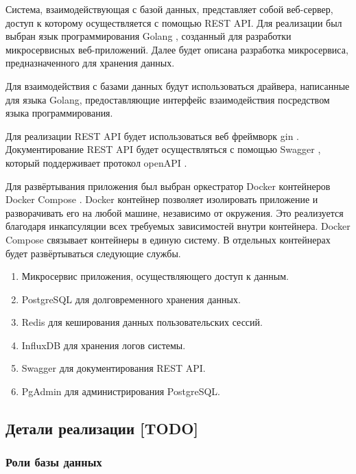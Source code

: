 Система, взаимодействующая с базой данных, представляет собой веб-сервер, доступ к которому осуществляется с помощью REST API. Для реализации был выбран язык программирования Golang \cite{Golang}, созданный для разработки микросервисных веб-приложений. Далее будет описана разработка микросервиса, предназначенного для хранения данных. 

Для взаимодействия с базами данных будут использоваться драйвера, написанные для языка Golang, предоставляющие интерфейс взаимодействия посредством языка программирования.

Для реализации REST API будет использоваться веб фреймворк gin \cite{Gin}. Документирование REST API будет осуществляться с помощью Swagger \cite{Swagger}, который поддерживает протокол openAPI \cite{openAPI}.

Для развёртывания приложения был выбран оркестратор Docker контейнеров Docker Compose \cite{Docker_compose}. Docker контейнер позволяет изолировать приложение и разворачивать его на любой машине, независимо от окружения. Это реализуется благодаря инкапсуляции всех требуемых зависимостей внутри контейнера. Docker Compose связывает контейнеры в единую систему. В отдельных контейнерах будет развёртываться следующие службы.

\begin{enumerate}[label*=\arabic*.]
	\item Микросервис приложения, осуществляющего доступ к данным.
	\item PostgreSQL для долговременного хранения данных.
	\item Redis для кеширования данных пользовательских сессий.
	\item InfluxDB для хранения логов системы.
	\item Swagger для документирования REST API.
	\item PgAdmin для администрирования PostgreSQL.
\end{enumerate}




\subsection{Детали реализации [TODO]}

\subsubsection{Роли базы данных}

